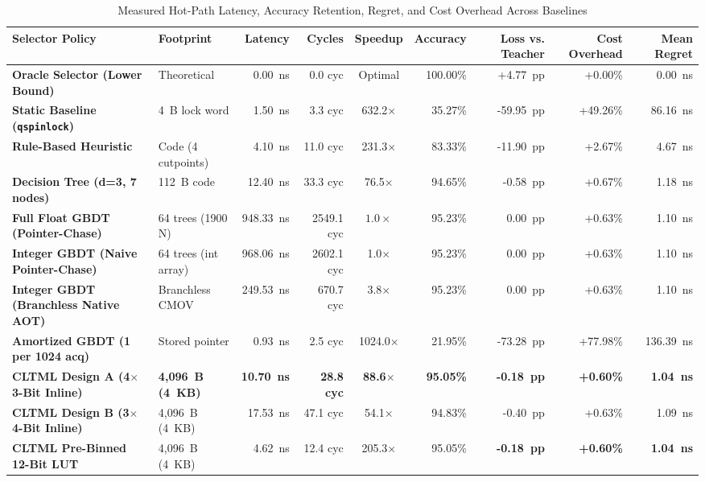 \documentclass[conference]{IEEEtran}
\begin{document}
\begin{table}[t]
\centering
\caption{Measured Hot-Path Latency, Accuracy Retention, Regret, and Cost Overhead Across Baselines}
\label{tab:results}
\begin{tabular}{llrrcrrrr}
\toprule
\textbf{Selector Policy} & \textbf{Footprint} & \textbf{Latency} & \textbf{Cycles} & \textbf{Speedup} & \textbf{Accuracy} & \textbf{Loss vs. Teacher} & \textbf{Cost Overhead} & \textbf{Mean Regret} \\
\midrule
\textbf{Oracle Selector (Lower Bound)} & Theoretical & 0.00~ns & 0.0 cyc & Optimal & 100.00\% & +4.77~pp & +0.00\% & 0.00~ns \\
\textbf{Static Baseline (\texttt{qspinlock})} & 4~B lock word & 1.50~ns & 3.3 cyc & 632.2$\times$ & 35.27\% & -59.95~pp & +49.26\% & 86.16~ns \\
\textbf{Rule-Based Heuristic} & Code (4 cutpoints) & 4.10~ns & 11.0 cyc & 231.3$\times$ & 83.33\% & -11.90~pp & +2.67\% & 4.67~ns \\
\textbf{Decision Tree (d=3, 7 nodes)} & 112~B code & 12.40~ns & 33.3 cyc & 76.5$\times$ & 94.65\% & -0.58~pp & +0.67\% & 1.18~ns \\
\textbf{Full Float GBDT (Pointer-Chase)} & 64 trees (1900 N) & 948.33~ns & 2549.1 cyc & $1.0\times$ & 95.23\% & 0.00~pp & +0.63\% & 1.10~ns \\
\textbf{Integer GBDT (Naive Pointer-Chase)} & 64 trees (int array) & 968.06~ns & 2602.1 cyc & 1.0$\times$ & 95.23\% & 0.00~pp & +0.63\% & 1.10~ns \\
\textbf{Integer GBDT (Branchless Native AOT)} & Branchless CMOV & 249.53~ns & 670.7 cyc & 3.8$\times$ & 95.23\% & 0.00~pp & +0.63\% & 1.10~ns \\
\textbf{Amortized GBDT (1 per 1024 acq)} & Stored pointer & 0.93~ns & 2.5 cyc & 1024.0$\times$ & 21.95\% & -73.28~pp & +77.98\% & 136.39~ns \\
\textbf{CLTML Design A (4$\times$3-Bit Inline)} & \textbf{4,096~B (4~KB)} & \textbf{10.70~ns} & \textbf{28.8 cyc} & \textbf{88.6$\times$} & \textbf{95.05\%} & \textbf{-0.18~pp} & \textbf{+0.60\%} & \textbf{1.04~ns} \\
\textbf{CLTML Design B (3$\times$4-Bit Inline)} & 4,096~B (4~KB) & 17.53~ns & 47.1 cyc & 54.1$\times$ & 94.83\% & -0.40~pp & +0.63\% & 1.09~ns \\
\textbf{CLTML Pre-Binned 12-Bit LUT} & 4,096~B (4~KB) & 4.62~ns & 12.4 cyc & 205.3$\times$ & 95.05\% & \textbf{-0.18~pp} & \textbf{+0.60\%} & \textbf{1.04~ns} \\
\bottomrule
\end{tabular}
\end{table}
\end{document}
